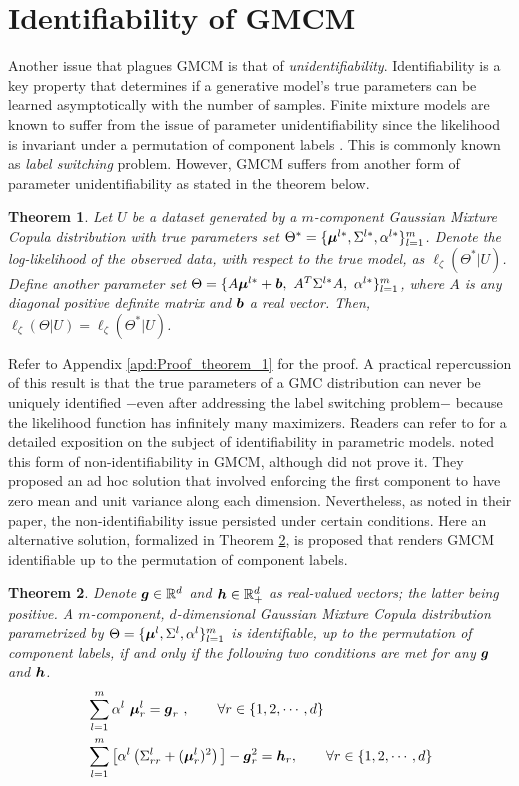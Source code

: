 \documentclass{article}
\theoremstyle{plain}
\newtheorem{theorem}{Theorem}[section]
\theoremstyle{definition}
\theoremstyle{remark}
\begin{document}
\section{Identifiability of GMCM}\label{sec:identifiability_GMCM}
Another issue that plagues GMCM is that of \emph{unidentifiability}. Identifiability is a key property that determines if a generative model's true parameters can be learned asymptotically with the number of samples. Finite mixture models are known to suffer from the issue of parameter unidentifiability since the likelihood is invariant under a permutation of component labels \citep{Stephens2000}. This is commonly known as \emph{label switching} problem. However, GMCM suffers from another form of parameter unidentifiability as stated in the theorem below.
\begin{theorem}
\label{thm:theorem1}
 Let $U$ be a dataset generated by a $m$-component Gaussian Mixture Copula distribution with true parameters set $\Theta^* = \{\boldsymbol{\mu}^{l*}, \Sigma^{l*}, \alpha^{l*}\}_{l=1}^m$. Denote the log-likelihood of the observed data, with respect to the true model, as $\ell_\zeta(\Theta^*|U)$. Define another parameter set $\Theta= \{A\bs{\mu}^{l*}+\bs{b}, \ A^T\Sigma^{l*}A, \ \alpha^{l*}\}_{l=1}^m$, where $A$ is any diagonal positive definite matrix and $\boldsymbol{b}$ a real vector. Then, $\ell_\zeta(\Theta|U) = \ell_\zeta(\Theta^*|U)$.
\end{theorem}
Refer to Appendix \ref{apd:Proof_theorem_1} for the proof. A practical repercussion of this result is that the true parameters of a GMC distribution can never be uniquely identified $-$even after addressing the label switching problem$-$ because the likelihood function has infinitely many maximizers. Readers can refer to \citet{White1982} for a detailed exposition on the subject of identifiability in parametric models. \citet{Bilgrau2016} noted this form of non-identifiability in GMCM, although did not prove it. They proposed an ad hoc solution that involved enforcing the first component to have zero mean and unit variance along each dimension. Nevertheless, as noted in their paper, the non-identifiability issue persisted under certain conditions. Here an alternative solution, formalized in Theorem \ref{thm:theorem2}, is proposed that renders GMCM identifiable up to the permutation of component labels.
\begin{theorem}
\label{thm:theorem2} 
Denote $\boldsymbol{g}\in \mathbb{R}^d$ and $\boldsymbol{h}\in \mathbb{R}_+^d$ as real-valued vectors; the latter being positive. A $m$-component, $d$-dimensional Gaussian Mixture Copula distribution parametrized by $\Theta = \{\boldsymbol{\mu}^l, \Sigma^l, \alpha^l\}_{l=1}^m$ is identifiable, up to the permutation of component labels, if and only if the following two conditions are met for any $\boldsymbol{g}$ and $\boldsymbol{h}$.
\begin{align}
&\sum_{l=1}^m \alpha^l \ \boldsymbol{\mu}_r^l=\boldsymbol{g}_r \ ,\qquad \forall r \in \{1,2,\cdots,d\} \label{eq:identifiability_constraint_1} \\
&\sum_{l=1}^m \big[ \alpha^l \left(\Sigma_{rr}^l+(\boldsymbol{\mu}_r^l)^2\right)\big] -\boldsymbol{g}_r^2 =\boldsymbol{h}_r ,\qquad \forall r \in \{1,2,\cdots,d\}\label{eq:identifiability_constraint_2}
\end{align}
\end{theorem}
\end{document}
